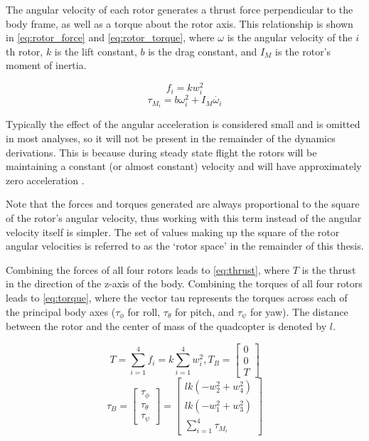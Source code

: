 \documentclass[letterpaper,12pt,titlepage,oneside,final]{book}
\begin{document}
The angular velocity of each rotor generates a thrust force perpendicular to the body frame, as well as a torque about the rotor axis. 
This relationship is shown in \eqref{eq:rotor_force} and \eqref{eq:rotor_torque}, 
where $\omega$ is the angular velocity of the $i$th rotor, $k$ is the lift constant, $b$ is the drag constant, and $I_{M}$ is the rotor's moment of inertia.

\begin{equation} \label{eq:rotor_force}
f_{i} = kw_{i}^{2}
\end{equation}
\begin{equation} \label{eq:rotor_torque}
\tau_{M_{i}} = b\omega_{i}^{2} + I_{M}\dot{\omega_{i}}
\end{equation}

Typically the effect of the angular acceleration is considered small and is omitted in most analyses, so it will not be present in the remainder of the dynamics derivations. This is because during steady state flight the rotors will be maintaining a constant (or almost constant) velocity and will have approximately zero acceleration \cite{gibiansky}.

Note that the forces and torques generated are always proportional to the square of the rotor's angular velocity, thus working with this term instead of the angular velocity itself is simpler. %
The set of values making up the square of the rotor angular velocities is referred to as the `rotor space' in the remainder of this thesis.

Combining the forces of all four rotors leads to \eqref{eq:thrust}, where $T$ is the thrust in the direction of the z-axis of the body. 
Combining the torques of all four rotors leads to \eqref{eq:torque}, where the vector tau represents the torques across each of the principal body axes ($\tau_{\phi}$ for roll, $\tau_{\theta}$ for pitch, and $\tau_{\psi}$ for yaw). 
The distance between the rotor and the center of mass of the quadcopter is denoted by $l$. 

\begin{equation} \label{eq:thrust}
T = \sum_{i=1}^{4} f_{i} = k\sum_{i=1}^{4} w^{2}_{i} , T_{B} = 
\begin{bmatrix}
0 \\
0 \\
T
\end{bmatrix}
\end{equation}
\begin{equation} \label{eq:torque}
\tau_{B} = 
\begin{bmatrix}
\tau_{\phi} \\
\tau_{\theta} \\
\tau_{\psi}
\end{bmatrix}
=
\begin{bmatrix}
lk(-w_{2}^{2}+w_{4}^{2}) \\
lk(-w_{1}^{2}+w_{3}^{2}) \\
\sum_{i=1}^{4}\tau_{M_{i}}
\end{bmatrix}
\end{equation}
\end{document}
